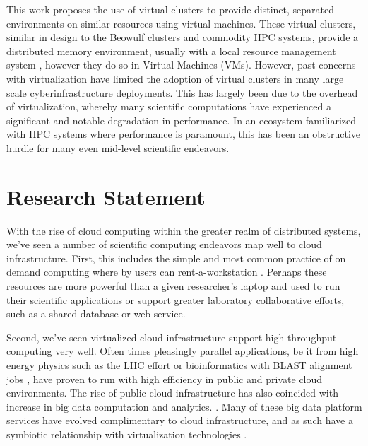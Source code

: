 This work proposes the use of virtual clusters \cite{Foster2006} to provide distinct, separated environments on similar resources using virtual machines. These virtual clusters, similar in design to the Beowulf clusters and commodity HPC systems, provide a distributed memory environment, usually with a local resource management system \cite{czajkowski1998resource}, however they do so in Virtual Machines (VMs).  However, past concerns with virtualization have limited the adoption of virtual clusters in many large scale cyberinfrastructure deployments. This has largely been due to the overhead of virtualization, whereby many scientific computations have experienced a significant and notable degradation in performance.  In an ecosystem familiarized with HPC systems where performance is paramount, this has been an obstructive hurdle for many even mid-level scientific endeavors.

\section{Research Statement}
\label{sec:stmt}


With the rise of cloud computing within the greater realm of distributed systems, we've seen a number of scientific computing endeavors map well to cloud infrastructure. First, this includes the simple and most common practice of on demand computing where by users can rent-a-workstation \cite{kondo2009cost}. Perhaps these resources are more powerful than a given researcher's laptop and used to run their scientific applications or support greater laboratory collaborative efforts, such as a shared database or web service. 

Second, we've seen virtualized cloud infrastructure support high throughput computing very well. Often times pleasingly parallel applications, be it from high energy physics such as the LHC effort \cite{buncic2010cernvm, bell2015scaling} or bioinformatics with BLAST alignment jobs \cite{menon2012cloud}, have proven to run with high efficiency in public and private cloud environments. The rise of public cloud infrastructure has also coincided with increase in big data computation and analytics.
.
Many of these big data platform services have evolved complimentary to cloud infrastructure, and as such have a symbiotic relationship with virtualization technologies \cite{gunarathne2010mapreduce}.  

